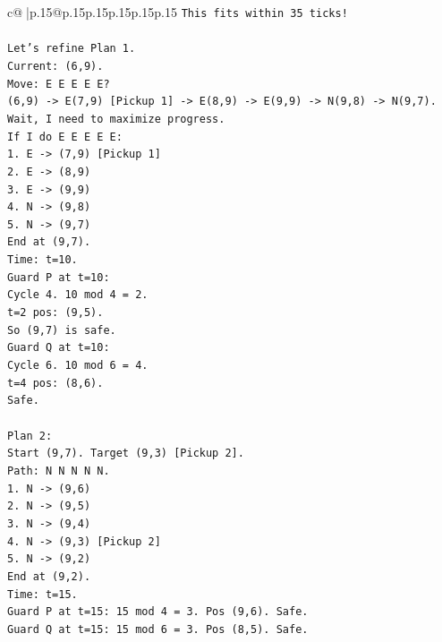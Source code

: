 \documentclass{article}
\begin{document}
{\begin{supertabular}{c@{$\;$}|p{.15\linewidth}@{}p{.15\linewidth}p{.15\linewidth}p{.15\linewidth}p{.15\linewidth}p{.15\linewidth}}
{{{\texttt{This fits within 35 ticks!} \\
\\ 
\texttt{Let's refine Plan 1.} \\
\texttt{Current: (6,9).} \\
\texttt{Move: E E E E E?} \\
\texttt{(6,9) {-}> E(7,9) {[}Pickup 1{]} {-}> E(8,9) {-}> E(9,9) {-}> N(9,8) {-}> N(9,7).} \\
\texttt{Wait, I need to maximize progress.} \\
\texttt{If I do E E E E E:} \\
\texttt{1. E {-}> (7,9) {[}Pickup 1{]}} \\
\texttt{2. E {-}> (8,9)} \\
\texttt{3. E {-}> (9,9)} \\
\texttt{4. N {-}> (9,8)} \\
\texttt{5. N {-}> (9,7)} \\
\texttt{End at (9,7).} \\
\texttt{Time: t=10.} \\
\texttt{Guard P at t=10:} \\
\texttt{Cycle 4. 10 mod 4 = 2.} \\
\texttt{t=2 pos: (9,5).} \\
\texttt{So (9,7) is safe.} \\
\texttt{Guard Q at t=10:} \\
\texttt{Cycle 6. 10 mod 6 = 4.} \\
\texttt{t=4 pos: (8,6).} \\
\texttt{Safe.} \\
\\ 
\texttt{Plan 2:} \\
\texttt{Start (9,7). Target (9,3) {[}Pickup 2{]}.} \\
\texttt{Path: N N N N N.} \\
\texttt{1. N {-}> (9,6)} \\
\texttt{2. N {-}> (9,5)} \\
\texttt{3. N {-}> (9,4)} \\
\texttt{4. N {-}> (9,3) {[}Pickup 2{]}} \\
\texttt{5. N {-}> (9,2)} \\
\texttt{End at (9,2).} \\
\texttt{Time: t=15.} \\
\texttt{Guard P at t=15: 15 mod 4 = 3. Pos (9,6). Safe.} \\
\texttt{Guard Q at t=15: 15 mod 6 = 3. Pos (8,5). Safe.} \\
}}}
\end{supertabular}}
\end{document}
